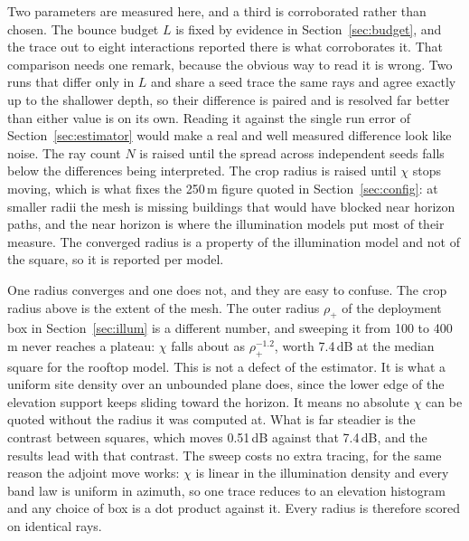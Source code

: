 Two parameters are measured here, and a third is corroborated
rather than chosen. The bounce budget $L$ is fixed by evidence in
Section~\ref{sec:budget}, and the trace out to eight interactions reported
there is what corroborates it. That comparison needs one remark, because the obvious way to read it is
wrong. Two runs that differ only in $L$ and share a seed trace the same rays and
agree exactly up to the shallower depth, so their difference is paired and is
resolved far better than either value is on its own. Reading it against the single run
error of Section~\ref{sec:estimator} would make a real and well measured
difference look like noise. The ray count $N$ is raised until the spread across
independent seeds falls below the differences being interpreted. The crop radius is raised until
$\chi$ stops moving, which is what fixes the 250\,m figure quoted in
Section~\ref{sec:config}: at smaller radii the mesh is missing buildings that
would have
blocked near horizon paths, and the near horizon is where the illumination
models put most of their measure. The converged radius is a property of the
illumination model and not of the square, so it is reported per model.

One radius converges and one does not, and they are easy to confuse. The crop
radius above is the extent of the mesh. The outer radius $\rho_+$ of the
deployment box in Section~\ref{sec:illum} is a different number, and sweeping it
from 100 to 400\,m never reaches a plateau: $\chi$ falls about as
$\rho_+^{-1.2}$, worth 7.4\,dB at the median square for the rooftop model. This
is not a defect of the estimator. It is what a uniform site density over an
unbounded plane does, since the lower edge of the elevation support keeps
sliding toward the horizon. It means no absolute $\chi$ can be quoted without
the radius it was computed at. What is far steadier is the contrast between
squares, which moves 0.51\,dB against that 7.4\,dB, and the results lead with
that contrast. The sweep costs no extra tracing, for the same reason the
adjoint move works: $\chi$ is linear in the illumination density and every band
law is uniform in azimuth, so one trace reduces to an elevation histogram and
any choice of box is a dot product against it. Every radius is therefore scored
on identical rays.

